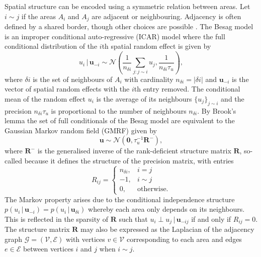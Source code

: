 \documentclass[a4paper, nobind]{templates/ociamthesis}
\newcommand{\bR}{\mathbf{R}}
\newcommand{\N}{\mathcal{N}}
\newcommand{\bu}{\mathbf{u}}
\begin{document}
Spatial structure can be encoded using a symmetric relation between areas.
Let \(i \sim j\) if the areas \(A_i\) and \(A_j\) are adjacent or neighbouring.
Adjacency is often defined by a shared border, though other choices are possible \autocite{paciorek2013spatial}.
The Besag model \autocite{besag1991bayesian} is an improper conditional auto-regressive (ICAR) model where the full conditional distribution of the \(i\)th spatial random effect is given by
\begin{equation}
    u_i \, | \, \bu_{-i} \sim \N \left(\frac{1}{n_{\delta i}} \sum_{j: j \sim i} u_j, \frac{1}{n_{\delta i}\tau_u}\right), \label{eq:besag}
\end{equation}
where \(\delta i\) is the set of neighbours of \(A_i\) with cardinality \(n_{\delta i} = |\delta i|\) and \(\bu_{-i}\) is the vector of spatial random effects with the \(i\)th entry removed.
The conditional mean of the random effect \(u_i\) is the average of its neighbours \(\{u_j\}_{j \sim i}\) and the precision \(n_{\delta i}\tau_u\) is proportional to the number of neighbours \(n_{\delta i}\).
By Brook's lemma \autocite{rue2005gaussian} the set of full conditionals of the Besag model are equivalent to the Gaussian Markov random field (GMRF) given by
\begin{equation}
    \bu \sim \mathcal{N}(\mathbf{0}, \tau_u^{-1} \bR^{-}), \label{eq:gmrf}
\end{equation}
where \(\bR^{-}\) is the generalised inverse of the rank-deficient structure matrix \(\bR\), so-called because it defines the structure of the precision matrix, with entries
\begin{equation}
    R_{ij} =
    \begin{cases}
        n_{\delta i}, & i = j \\
        -1, & i \sim j \\
        0, & \text{otherwise.}
    \end{cases}
\end{equation}
The Markov property arises due to the conditional independence structure \(p(u_i \, | \, \bu_{-i}) = p(u_i \, | \, \bu_{\delta i})\) whereby each area only depends on its neighbours.
This is reflected in the sparsity of \(\bR\) such that \(u_i \perp u_j \, | \, \bu_{-ij}\) if and only if \(R_{ij} = 0\).
The structure matrix \(\bR\) may also be expressed as the Laplacian of the adjacency graph \(\mathcal{G} = (\mathcal{V}, \mathcal{E})\) with vertices \(v \in \mathcal{V}\) corresponding to each area and edges \(e \in \mathcal{E}\) between vertices \(i\) and \(j\) when \(i \sim j\).
\end{document}
